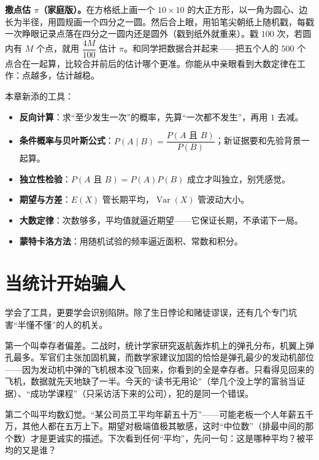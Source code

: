 \begin{shiyan}
\textbf{撒点估 $\pi$（家庭版）。}在方格纸上画一个 $10\times 10$ 的大正方形，以一角为圆心、边长为半径，用圆规画一个四分之一圆。然后合上眼，用铅笔尖朝纸上随机戳，每戳一次睁眼记录点落在四分之一圆内还是圆外（戳到纸外就重来）。戳 $100$ 次，若圆内有 $M$ 个点，就用 $\dfrac{4M}{100}$ 估计 $\pi$。和同学把数据合并起来——把五个人的 $500$ 个点合在一起算，比较合并前后的估计哪个更准。你能从中亲眼看到大数定律在工作：点越多，估计越稳。
\end{shiyan}

\begin{toolbox}
本章新添的工具：
\begin{itemize}
  \item \textbf{反向计算}：求“至少发生一次”的概率，先算“一次都不发生”，再用 $1$ 去减。
  \item \textbf{条件概率与贝叶斯公式}：$P(A\mid B)=\dfrac{P(A\text{ 且 }B)}{P(B)}$；新证据要和先验背景一起算。
  \item \textbf{独立性检验}：$P(A\text{ 且 }B)=P(A)P(B)$ 成立才叫独立，别凭感觉。
  \item \textbf{期望与方差}：$E(X)$ 管长期平均，$\operatorname{Var}(X)$ 管波动大小。
  \item \textbf{大数定律}：次数够多，平均值就逼近期望——它保证长期，不承诺下一局。
  \item \textbf{蒙特卡洛方法}：用随机试验的频率逼近面积、常数和积分。
\end{itemize}
\end{toolbox}

\section{当统计开始骗人}

学会了工具，更要学会识别陷阱。除了生日悖论和赌徒谬误，还有几个专门坑害“半懂不懂”的人的机关。

第一个叫幸存者偏差。二战时，统计学家研究返航轰炸机上的弹孔分布，机翼上弹孔最多。军官们主张加固机翼，而数学家建议加固的恰恰是弹孔最少的发动机部位——因为发动机中弹的飞机根本没飞回来，你看到的全是幸存者。只看得见回来的飞机，数据就先天地缺了一半。今天的“读书无用论”（举几个没上学的富翁当证据）、“成功学课程”（只采访活下来的公司），犯的是同一个错误。

第二个叫平均数幻觉。“某公司员工平均年薪五十万”——可能老板一个人年薪五千万，其他人都在五万上下。期望对极端值极其敏感，这时“中位数”（排最中间的那个数）才是更诚实的描述。下次看到任何“平均”，先问一句：这是哪种平均？被平均的又是谁？

